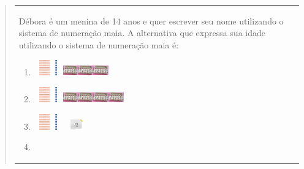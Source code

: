 \begin{enumerate}
\begin{escolha}
\begin{enumerate}
\begin{itemize}
\begin{itemize}
\begin{escolha}
\begin{quote}
\begin{escolha}
{\begin{longtable}[]{@{}l@{}}
\begin{itemize}
Débora é um menina de 14 anos e quer escrever seu nome utilizando o
sistema de numeração maia. A alternativa que expressa sua idade
utilizando o sistema de numeração maia é:

\begin{enumerate}
\def\labelenumi{\alph{enumi})}
\item
  \includegraphics[width=0.50004in,height=0.26669in]{media/image14.png}\includegraphics[width=0.25836in,height=0.18335in]{media/image15.png}\includegraphics[width=0.25836in,height=0.18335in]{media/image15.png}\includegraphics[width=0.25836in,height=0.18335in]{media/image15.png}
\item
  \includegraphics[width=0.50004in,height=0.26669in]{media/image14.png}\includegraphics[width=0.25836in,height=0.18335in]{media/image15.png}\includegraphics[width=0.25836in,height=0.18335in]{media/image15.png}\includegraphics[width=0.25836in,height=0.18335in]{media/image15.png}\includegraphics[width=0.25836in,height=0.18335in]{media/image15.png}
\item
  \includegraphics[width=0.50004in,height=0.26669in]{media/image14.png}\includegraphics[width=0.47504in,height=0.18335in]{media/image16.png}
\item

\end{enumerate}
\end{itemize}
\end{longtable}}
\end{escolha}
\end{quote}
\end{escolha}
\end{itemize}
\end{itemize}
\end{enumerate}
\end{escolha}
\end{enumerate}
